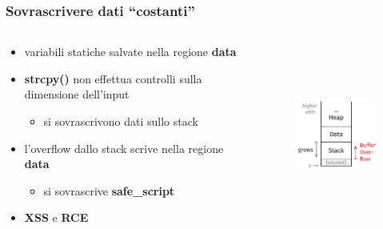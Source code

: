 \documentclass{beamer}
\begin{document}
\begin{frame}
  \frametitle{Sovrascrivere dati ``costanti''}
  \begin{columns}
    \begin{column}{0.55\textwidth}
      \begin{itemize}
        \item variabili statiche salvate nella regione \textbf{data}
        \pause
        \item \textbf{strcpy()} non effettua controlli sulla dimensione dell'input
          \begin{itemize}
            \item si sovrascrivono dati sullo stack
          \end{itemize}
          \pause
        \item l'overflow dallo stack scrive nella regione \textbf{data}
        \pause
        \begin{itemize}
      \item si sovrascrive \textbf{safe\_script} 
        \end{itemize}
      \item \textbf{XSS} e \textbf{RCE}  
      \end{itemize}
      
    \end{column}
    \begin{column}{0.45\textwidth}
      \begin{figure}[htbp]
        \includegraphics[width=4cm,height=6cm,keepaspectratio]{images/memory_layout.png}
        \newline
        \begin{figure}
           

\end{figure}
\end{figure}
\end{column}
\end{columns}
\end{frame}
\end{document}
